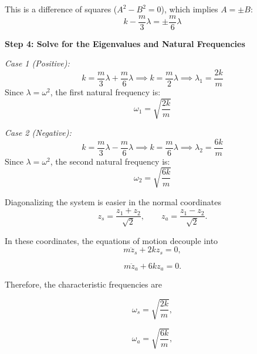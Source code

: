 \documentclass[a4paper,11pt]{article}
\begin{document}
This is a difference of squares ($A^2 - B^2 = 0$), which implies $A = \pm B$:
\begin{equation}
    k - \frac{m}{3}\lambda = \pm \frac{m}{6}\lambda
\end{equation}

\vspace{0.5cm}
\textbf{Step 4: Solve for the Eigenvalues and Natural Frequencies}

\textit{Case 1 (Positive):}
\begin{equation}
    k = \frac{m}{3}\lambda + \frac{m}{6}\lambda \implies k = \frac{m}{2}\lambda \implies \lambda_1 = \frac{2k}{m}
\end{equation}
Since $\lambda = \omega^2$, the first natural frequency is:
\begin{equation}
    \omega_1 = \sqrt{\frac{2k}{m}}
\end{equation}

\textit{Case 2 (Negative):}
\begin{equation}
    k = \frac{m}{3}\lambda - \frac{m}{6}\lambda \implies k = \frac{m}{6}\lambda \implies \lambda_2 = \frac{6k}{m}
\end{equation}
Since $\lambda = \omega^2$, the second natural frequency is:
\begin{equation}
    \omega_2 = \sqrt{\frac{6k}{m}}
\end{equation}


Diagonalizing the system is easier in the normal coordinates
\begin{equation}
z_s = \frac{z_1 + z_2}{\sqrt{2}}, \qquad z_a = \frac{z_1 - z_2}{\sqrt{2}}.
\end{equation}

In these coordinates, the equations of motion decouple into
\begin{equation}
m\ddot{z}_s + 2k z_s = 0,
\end{equation}

\begin{equation}
m\ddot{z}_a + 6k z_a = 0.
\end{equation}

Therefore, the characteristic frequencies are

\begin{equation}
\omega_s = \sqrt{\frac{2k}{m}},
\end{equation}

\begin{equation}
\omega_a = \sqrt{\frac{6k}{m}},
\end{equation}
\end{document}
